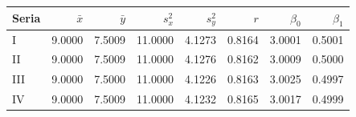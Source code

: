 \begin{tabular}{lrrrrrrr}
\toprule
Seria & $\bar{x}$ & $\bar{y}$ & $s_x^2$ & $s_y^2$ & $r$ & $\beta_0$ & $\beta_1$ \\
\midrule
I & \num{9.0000} & \num{7.5009} & \num{11.0000} & \num{4.1273} & \num{0.8164} & \num{3.0001} & \num{0.5001} \\
II & \num{9.0000} & \num{7.5009} & \num{11.0000} & \num{4.1276} & \num{0.8162} & \num{3.0009} & \num{0.5000} \\
III & \num{9.0000} & \num{7.5000} & \num{11.0000} & \num{4.1226} & \num{0.8163} & \num{3.0025} & \num{0.4997} \\
IV & \num{9.0000} & \num{7.5009} & \num{11.0000} & \num{4.1232} & \num{0.8165} & \num{3.0017} & \num{0.4999} \\
\bottomrule
\end{tabular}
